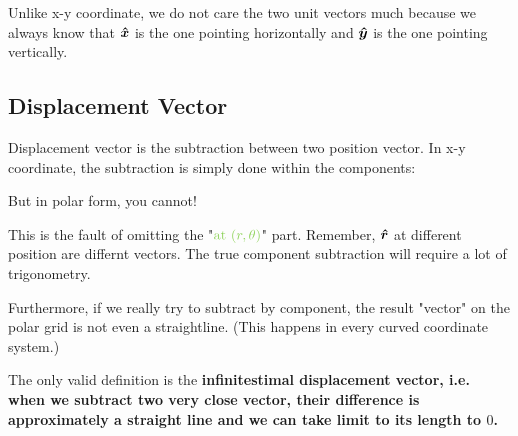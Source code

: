 \documentclass[class=article, crop=false, 12pt]{standalone}
\begin{document}

Unlike x-y coordinate, 
we do not care the two unit vectors much because we always know that 
$\vu*{x}$ is the one pointing horizontally and $\vu*{y}$ is the one pointing vertically.





\subsection{Displacement Vector}

Displacement vector is the subtraction between two position vector. 
In x-y coordinate, the subtraction is simply done within the components:

But in polar form, you cannot!

This is the fault of omitting the "$\green{\text{at }(r,\theta)}$" part. 
Remember, $\vu*{r}$ at different position are differnt vectors. 
The true component subtraction will require a lot of trigonometry. 


Furthermore, if we really try to subtract by component, 
the result "vector" on the polar grid is not even a straightline. 
(This happens in every curved coordinate system.)


The only valid definition is the \bf{infinitestimal displacement vector}, 
i.e. when we subtract two very close vector, 
their difference is approximately a straight line and we can take limit to its length to $0$. 
\end{document}
